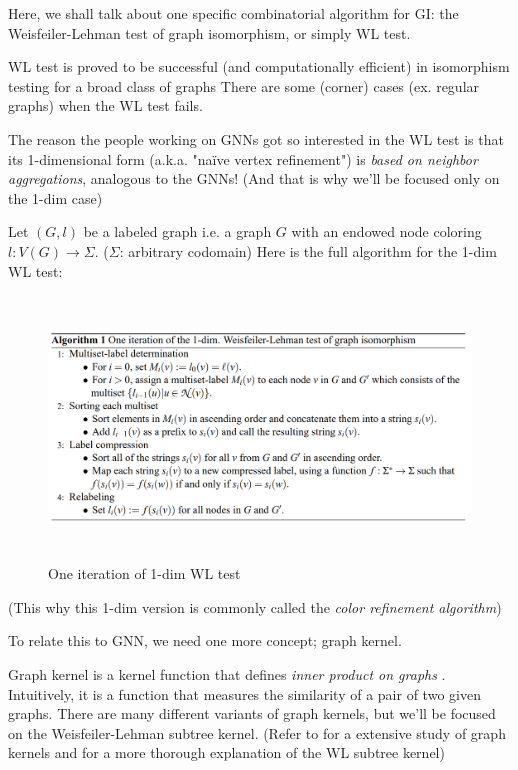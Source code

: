 Here, we shall talk about one specific combinatorial algorithm for \textsc{GI}: the Weisfeiler-Lehman test of graph isomorphism\cite{Weisfeiler1968}, or simply WL test.

WL test is proved to be successful (and computationally efficient) in isomorphism testing for a broad class of graphs\cite{Babai1979} There are some (corner) cases (ex. regular graphs) when the WL test fails\cite{Cai1992}.

The reason the people working on GNNs got so interested in the WL test is that its 1-dimensional form (a.k.a. "na\"ive vertex refinement") is {\it based on neighbor aggregations}, analogous to the GNNs!
(And that is why we'll be focused only on the 1-dim case)

Let $(G, l)$ be a labeled graph i.e. a graph $G$ with an endowed node coloring $l : V(G) \rightarrow \Sigma$.
($\Sigma$: arbitrary codomain)
Here is the full algorithm for the 1-dim WL test\cite{Shervashidze2009}:

\begin{figure}[hbt]
	\includegraphics[height=7cm]{preliminaries/fig/wl-alg.png}
	\caption{One iteration of 1-dim WL test}
\end{figure}
	(This why this 1-dim version is commonly called the {\it color refinement algorithm})

To relate this to GNN, we need one more concept; graph kernel.

Graph kernel is a kernel function that defines {\it inner product on graphs} \cite{Vishwanathan2010}.
Intuitively, it is a function that measures the similarity of a pair of two given graphs.
There are many different variants of graph kernels, but we'll be focused on the Weisfeiler-Lehman subtree kernel\cite{Shervashidze2009}.
(Refer to \cite{Vishwanathan2010} for a extensive study of graph kernels and \cite{Shervashidze2011} for a more thorough explanation of the WL subtree kernel)

